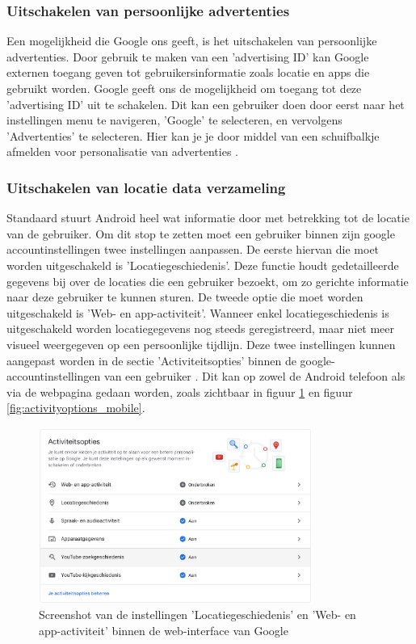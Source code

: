 \subsubsection{Uitschakelen van persoonlijke advertenties}
Een mogelijkheid die Google ons geeft, is het uitschakelen van persoonlijke advertenties. Door gebruik te maken van een 'advertising ID' kan Google externen toegang geven tot gebruikersinformatie zoals locatie en apps die gebruikt worden. Google geeft ons de mogelijkheid om toegang tot deze 'advertising ID' uit te schakelen. Dit kan een gebruiker doen door eerst naar het instellingen menu te navigeren, 'Google' te selecteren, en vervolgens 'Advertenties' te selecteren. Hier kan je je door middel van een schuifbalkje afmelden voor personalisatie van advertenties \autocite{knight_degoogle}.

\subsubsection{Uitschakelen van locatie data verzameling}
Standaard stuurt Android heel wat informatie door met betrekking tot de locatie van de gebruiker. Om dit stop te zetten moet een gebruiker binnen zijn google accountinstellingen twee instellingen aanpassen. De eerste hiervan die moet worden uitgeschakeld is 'Locatiegeschiedenis'. Deze functie houdt gedetailleerde gegevens bij over de locaties die een gebruiker bezoekt, om zo gerichte informatie naar deze gebruiker te kunnen sturen. De tweede optie die moet worden uitgeschakeld is 'Web- en app-activiteit'. Wanneer enkel locatiegeschiedenis is uitgeschakeld worden locatiegegevens nog steeds geregistreerd, maar niet meer visueel weergegeven op een persoonlijke tijdlijn. Deze twee instellingen kunnen aangepast worden in de sectie 'Activiteitsopties' binnen de google-accountinstellingen van een gebruiker \autocite{stolzoff_tracking-location-data}. Dit kan op zowel de Android telefoon als via de webpagina gedaan worden, zoals zichtbaar in figuur \ref{fig:activityoptions} en figuur \ref{fig:activityoptions_mobile}.

\begin{figure}
    \centering
    \includegraphics[width=0.8\textwidth]{img/activiteitsopties.png}
    \caption{Screenshot van de instellingen 'Locatiegeschiedenis' en 'Web- en app-activiteit' binnen de web-interface van Google}
    \label{fig:activityoptions}
\end{figure}


